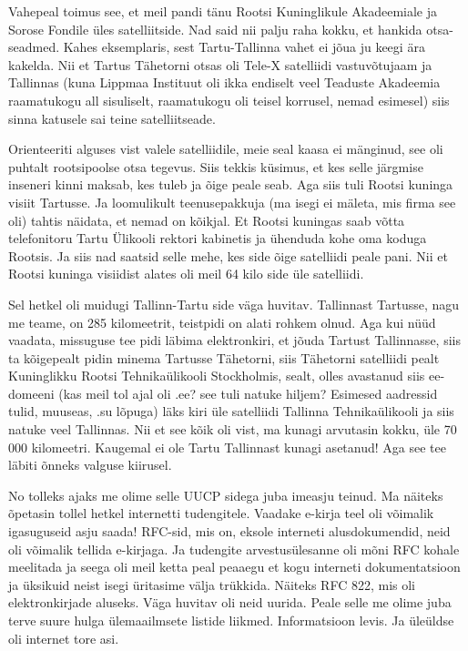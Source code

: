 
Vahepeal toimus see, et meil pandi tänu Rootsi Kuninglikule Akadeemiale ja 
Sorose Fondile üles satelliitside. Nad said nii palju raha 
kokku, et hankida otsa-seadmed. Kahes eksemplaris, sest Tartu-Tallinna vahet ei 
jõua ju keegi ära kakelda. Nii et Tartus Tähetorni otsas oli 
Tele-X satelliidi  vastuvõtujaam ja Tallinnas (kuna Lippmaa 
Instituut oli ikka endiselt veel Teaduste 
Akadeemia raamatukogu all sisuliselt, raamatukogu oli teisel korrusel, nemad 
esimesel) siis sinna katusele sai teine satelliitseade. 

Orienteeriti alguses vist valele satelliidile, meie seal kaasa ei mänginud, see 
oli puhtalt rootsipoolse otsa tegevus. Siis tekkis küsimus, et kes selle 
järgmise inseneri kinni maksab, kes tuleb ja õige peale seab. Aga siis tuli 
Rootsi kuninga visiit Tartusse. Ja loomulikult teenusepakkuja (ma isegi ei mäleta, mis firma 
see oli) tahtis näidata, et nemad on kõikjal. Et Rootsi kuningas saab võtta 
telefonitoru Tartu Ülikooli rektori kabinetis ja ühenduda kohe oma koduga 
Rootsis. Ja siis nad saatsid selle mehe, kes side õige satelliidi peale pani. 
Nii et Rootsi kuninga visiidist alates oli meil  64 kilo side üle satelliidi. 

Sel hetkel oli muidugi Tallinn-Tartu side väga huvitav. Tallinnast Tartusse, 
nagu me teame, on 285 kilomeetrit, teistpidi on alati rohkem olnud. Aga kui 
nüüd vaadata, missuguse tee pidi läbima elektronkiri, et jõuda Tartust 
Tallinnasse, siis ta kõigepealt pidin minema Tartusse Tähetorni, siis Tähetorni 
satelliidi pealt Kuninglikku Rootsi Tehnikaülikooli Stockholmis, sealt, olles 
avastanud siis ee-domeeni (kas meil tol ajal oli .ee? see tuli natuke hiljem? 
Esimesed aadressid tulid, muuseas, .su lõpuga) läks kiri üle satelliidi 
Tallinna Tehnikaülikooli ja siis natuke veel Tallinnas. Nii et see kõik oli 
vist, ma kunagi arvutasin kokku, üle 70 000 kilomeetri\label{sisu!70k}. Kaugemal ei ole Tartu 
Tallinnast kunagi asetanud! Aga see tee läbiti õnneks valguse kiirusel. 


No tolleks ajaks me olime selle UUCP sidega juba  imeasju teinud. Ma näiteks 
õpetasin tollel hetkel internetti tudengitele. Vaadake e-kirja teel oli 
võimalik igasuguseid asju saada! RFC-sid, mis on, eksole interneti 
alusdokumendid, neid oli võimalik tellida e-kirjaga. Ja tudengite 
arvestusülesanne oli mõni RFC kohale meelitada ja seega oli meil ketta peal 
peaaegu et kogu interneti dokumentatsioon ja üksikuid neist isegi üritasime 
välja trükkida. Näiteks RFC 822, mis oli elektronkirjade aluseks. Väga huvitav 
oli neid uurida. Peale selle me olime juba terve suure hulga ülemaailmsete 
listide liikmed. Informatsioon levis. Ja üleüldse oli internet tore asi. 

